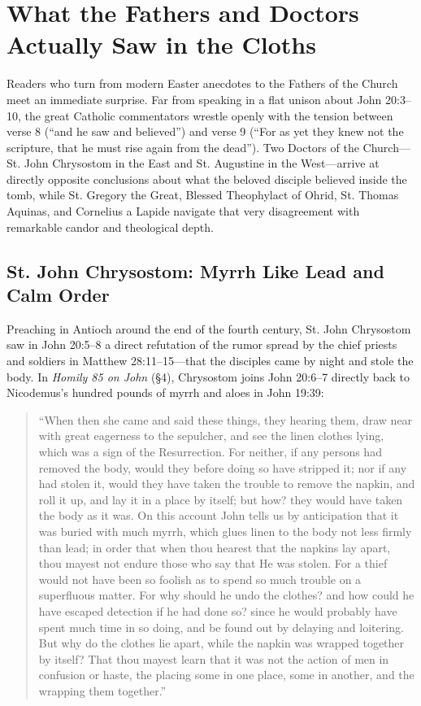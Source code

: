 \section{What the Fathers and Doctors Actually Saw in the Cloths}
\label{sec:patristic}

Readers who turn from modern Easter anecdotes to the Fathers of the Church meet an immediate surprise. Far from speaking in a flat unison about John 20:3--10, the great Catholic commentators wrestle openly with the tension between verse 8 (``and he saw and believed'') and verse 9 (``For as yet they knew not the scripture, that he must rise again from the dead''). Two Doctors of the Church---St. John Chrysostom in the East and St. Augustine in the West---arrive at directly opposite conclusions about what the beloved disciple believed inside the tomb, while St. Gregory the Great, Blessed Theophylact of Ohrid, St. Thomas Aquinas, and Cornelius a Lapide navigate that very disagreement with remarkable candor and theological depth.

\subsection{St. John Chrysostom: Myrrh Like Lead and Calm Order}

Preaching in Antioch around the end of the fourth century, St. John Chrysostom saw in John 20:5--8 a direct refutation of the rumor spread by the chief priests and soldiers in Matthew 28:11--15---that the disciples came by night and stole the body. In \emph{Homily 85 on John} (\S 4), Chrysostom joins John 20:6--7 directly back to Nicodemus's hundred pounds of myrrh and aloes in John 19:39:
\begin{quote}
``When then she came and said these things, they hearing them, draw near with great eagerness to the sepulcher, and see the linen clothes lying, which was a sign of the Resurrection. For neither, if any persons had removed the body, would they before doing so have stripped it; nor if any had stolen it, would they have taken the trouble to remove the napkin, and roll it up, and lay it in a place by itself; but how? they would have taken the body as it was. On this account John tells us by anticipation that it was buried with much myrrh, which glues linen to the body not less firmly than lead; in order that when thou hearest that the napkins lay apart, thou mayest not endure those who say that He was stolen. For a thief would not have been so foolish as to spend so much trouble on a superfluous matter. For why should he undo the clothes? and how could he have escaped detection if he had done so? since he would probably have spent much time in so doing, and be found out by delaying and loitering. But why do the clothes lie apart, while the napkin was wrapped together by itself? That thou mayest learn that it was not the action of men in confusion or haste, the placing some in one place, some in another, and the wrapping them together.''
\end{quote}

